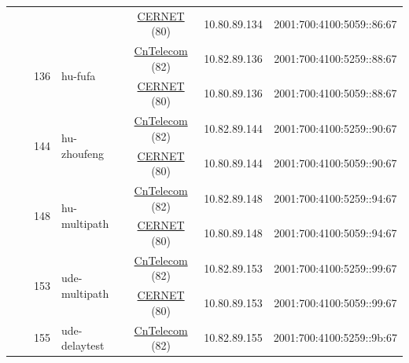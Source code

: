 \begin{small}
\begin{center}
\begin{longtable}{|c|c|c|c|c|c|c|c|}
  &  &  &  & \multicolumn{2}{|c|}{\tiny{\href{http://www.cernet.edu.cn}{CERNET} (80)}} & \tiny{10.80.89.134} & \tiny{2001:700:4100:5059::86:67} \\* \cline{3-3}\cline{4-4}\cline{5-5}\cline{6-6}\cline{7-7}\cline{8-8}
  &  & \multirow{2}{*}{\tiny{136}} & \multicolumn{1}{|l|}{\multirow{2}{*}{\tiny{hu-fufa}}} & \multicolumn{2}{|c|}{\tiny{\href{http://www.chinatelecom.com.cn}{CnTelecom} (82)}} & \tiny{10.82.89.136} & \tiny{2001:700:4100:5259::88:67} \\* \cline{5-5}\cline{6-6}\cline{7-7}\cline{8-8}
  &  &  &  & \multicolumn{2}{|c|}{\tiny{\href{http://www.cernet.edu.cn}{CERNET} (80)}} & \tiny{10.80.89.136} & \tiny{2001:700:4100:5059::88:67} \\* \cline{3-3}\cline{4-4}\cline{5-5}\cline{6-6}\cline{7-7}\cline{8-8}
  &  & \multirow{2}{*}{\tiny{144}} & \multicolumn{1}{|l|}{\multirow{2}{*}{\tiny{hu-zhoufeng}}} & \multicolumn{2}{|c|}{\tiny{\href{http://www.chinatelecom.com.cn}{CnTelecom} (82)}} & \tiny{10.82.89.144} & \tiny{2001:700:4100:5259::90:67} \\* \cline{5-5}\cline{6-6}\cline{7-7}\cline{8-8}
  &  &  &  & \multicolumn{2}{|c|}{\tiny{\href{http://www.cernet.edu.cn}{CERNET} (80)}} & \tiny{10.80.89.144} & \tiny{2001:700:4100:5059::90:67} \\* \cline{3-3}\cline{4-4}\cline{5-5}\cline{6-6}\cline{7-7}\cline{8-8}
  &  & \multirow{2}{*}{\tiny{148}} & \multicolumn{1}{|l|}{\multirow{2}{*}{\tiny{hu-multipath}}} & \multicolumn{2}{|c|}{\tiny{\href{http://www.chinatelecom.com.cn}{CnTelecom} (82)}} & \tiny{10.82.89.148} & \tiny{2001:700:4100:5259::94:67} \\* \cline{5-5}\cline{6-6}\cline{7-7}\cline{8-8}
  &  &  &  & \multicolumn{2}{|c|}{\tiny{\href{http://www.cernet.edu.cn}{CERNET} (80)}} & \tiny{10.80.89.148} & \tiny{2001:700:4100:5059::94:67} \\* \cline{3-3}\cline{4-4}\cline{5-5}\cline{6-6}\cline{7-7}\cline{8-8}
  &  & \multirow{2}{*}{\tiny{153}} & \multicolumn{1}{|l|}{\multirow{2}{*}{\tiny{ude-multipath}}} & \multicolumn{2}{|c|}{\tiny{\href{http://www.chinatelecom.com.cn}{CnTelecom} (82)}} & \tiny{10.82.89.153} & \tiny{2001:700:4100:5259::99:67} \\* \cline{5-5}\cline{6-6}\cline{7-7}\cline{8-8}
  &  &  &  & \multicolumn{2}{|c|}{\tiny{\href{http://www.cernet.edu.cn}{CERNET} (80)}} & \tiny{10.80.89.153} & \tiny{2001:700:4100:5059::99:67} \\* \cline{3-3}\cline{4-4}\cline{5-5}\cline{6-6}\cline{7-7}\cline{8-8}
  &  & \multirow{2}{*}{\tiny{155}} & \multicolumn{1}{|l|}{\multirow{2}{*}{\tiny{ude-delaytest}}} & \multicolumn{2}{|c|}{\tiny{\href{http://www.chinatelecom.com.cn}{CnTelecom} (82)}} & \tiny{10.82.89.155} & \tiny{2001:700:4100:5259::9b:67} \\* \cline{5-5}\cline{6-6}\cline{7-7}\cline{8-8}

\end{longtable}
\end{center}
\end{small}
